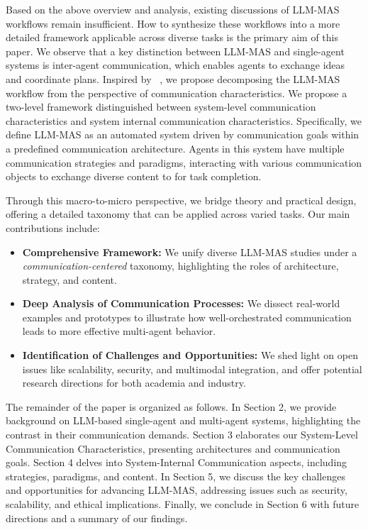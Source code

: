 Based on the above overview and analysis, existing discussions of LLM-MAS workflows remain insufficient. How to synthesize these workflows into a more detailed framework applicable across diverse tasks is the primary aim of this paper. We observe that a key distinction between LLM-MAS and single-agent systems is inter-agent communication, which enables agents to exchange ideas and coordinate plans. Inspired by ~\cite{communication_1,communication_2}, we propose decomposing the LLM-MAS workflow from the perspective of communication characteristics. We propose a two-level framework distinguished between system-level communication characteristics and system internal communication characteristics.  Specifically, we define LLM-MAS as an automated system driven by communication goals within a predefined communication architecture. Agents in this system have multiple communication strategies and paradigms, interacting with various communication objects to exchange diverse content to for task completion.

Through this macro-to-micro perspective, we bridge theory and practical design, offering a detailed taxonomy that can be applied across varied tasks. Our main contributions include:
\begin{itemize}
    \item \textbf{Comprehensive Framework:} We unify diverse LLM-MAS studies under a \textit{communication-centered} taxonomy, highlighting the roles of architecture, strategy, and content.
    \item \textbf{Deep Analysis of Communication Processes:} We dissect real-world examples and prototypes to illustrate how well-orchestrated communication leads to more effective multi-agent behavior.
    \item \textbf{Identification of Challenges and Opportunities:} We shed light on open issues like scalability, security, and multimodal integration, and offer potential research directions for both academia and industry.
\end{itemize}

The remainder of the paper is organized as follows. In Section 2, we provide background on LLM-based single-agent and multi-agent systems, highlighting the contrast in their communication demands. Section 3 elaborates our System-Level Communication Characteristics, presenting architectures and communication goals. Section 4 delves into System-Internal Communication aspects, including strategies, paradigms, and content. In Section 5, we discuss the key challenges and opportunities for advancing LLM-MAS, addressing issues such as security, scalability, and ethical implications. Finally, we conclude in Section 6 with future directions and a summary of our findings.

